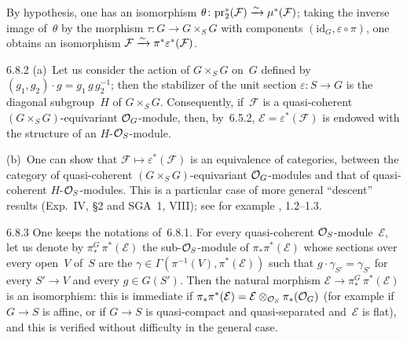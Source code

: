 By hypothesis, one has an isomorphism
\(\theta\colon\mathrm{pr}_2^*(\mathcal{F})\xrightarrow{\sim}\mu^*(\mathcal{F})\);
taking the inverse image of~\(\theta\) by the morphism
\(\tau\colon G\to G\times_S G\) with components \((\mathrm{id}_G,\varepsilon\circ\pi)\),
one obtains an isomorphism \(\mathcal{F}\xrightarrow{\sim}\pi^*\varepsilon^*(\mathcal{F})\).

\begin{remarks}{6.8.2}\label{I.6.8.2}
(a)~Let us consider the action of \(G\times_S G\) on~\(G\) defined by
\((g_1,g_2)\cdot g=g_1\,g\,g_2^{-1}\);
then the stabilizer of the unit section \(\varepsilon\colon S\to G\) is the
diagonal subgroup~\(H\) of \(G\times_S G\). Consequently, if~\(\mathcal{F}\)
is a quasi-coherent \((G\times_S G)\)-equivariant \(\mathcal{O}_G\)-module, then,
by~6.5.2, \(\mathcal{E}=\varepsilon^*(\mathcal{F})\) is endowed with the
structure of an \(H\)-\(\mathcal{O}_S\)-module.

(b)~One can show that \(\mathcal{F}\mapsto\varepsilon^*(\mathcal{F})\) is an
equivalence of categories, between the category of quasi-coherent
\((G\times_S G)\)-equivariant \(\mathcal{O}_G\)-modules and that of quasi-coherent
\(H\)-\(\mathcal{O}_S\)-modules. This is a particular case of more general ``descent''
results (\cf Exp.~IV, \S 2 and SGA~1, VIII); see for example \cite{Th87},
1.2--1.3.
\end{remarks}

\begin{remark}{6.8.3}\label{I.6.8.3}
One keeps the notations of~6.8.1. For every quasi-coherent
\(\mathcal{O}_S\)-module~\(\mathcal{E}\), let us denote by \(\pi_*^G\,\pi^*(\mathcal{E})\)
the sub-\(\mathcal{O}_S\)-module of \(\pi_*\pi^*(\mathcal{E})\) whose sections over
every open~\(V\) of~\(S\) are the
\(\gamma\in\Gamma(\pi^{-1}(V),\pi^*(\mathcal{E}))\) such that
\(g\cdot\gamma_{S'}=\gamma_{S'}\) for every \(S'\to V\) and every
\(g\in G(S')\). Then the natural morphism
\(\mathcal{E}\to\pi_*^G\,\pi^*(\mathcal{E})\) is an isomorphism: this is
immediate if \(\pi_*\pi^*(\mathcal{E})=\mathcal{E}\otimes_{\mathcal{O}_S}\pi_*(\mathcal{O}_G)\)
(for example if \(G\to S\) is affine, or if \(G\to S\) is quasi-compact and
quasi-separated and~\(\mathcal{E}\) is flat), and this is verified without
difficulty in the general case.
\end{remark}

